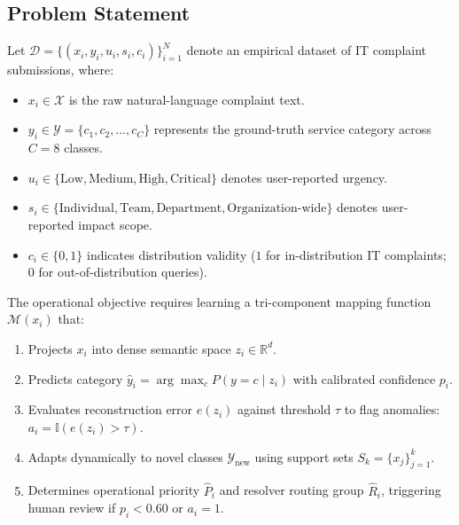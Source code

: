 \documentclass[conference]{IEEEtran}
\begin{document}
\subsection{Problem Statement}
Let $\mathcal{D} = \{(x_i, y_i, u_i, s_i, c_i)\}_{i=1}^N$ denote an empirical dataset of IT complaint submissions, where:
\begin{itemize}
    \item $x_i \in \mathcal{X}$ is the raw natural-language complaint text.
    \item $y_i \in \mathcal{Y} = \{c_1, c_2, \dots, c_C\}$ represents the ground-truth service category across $C = 8$ classes.
    \item $u_i \in \{\text{Low}, \text{Medium}, \text{High}, \text{Critical}\}$ denotes user-reported urgency.
    \item $s_i \in \{\text{Individual}, \text{Team}, \text{Department}, \text{Organization-wide}\}$ denotes user-reported impact scope.
    \item $c_i \in \{0, 1\}$ indicates distribution validity ($1$ for in-distribution IT complaints; $0$ for out-of-distribution queries).
\end{itemize}

The operational objective requires learning a tri-component mapping function $\mathcal{M}(x_i)$ that:
\begin{enumerate}
    \item Projects $x_i$ into dense semantic space $z_i \in \mathbb{R}^d$.
    \item Predicts category $\hat{y}_i = \arg\max_c P(y=c \mid z_i)$ with calibrated confidence $p_i$.
    \item Evaluates reconstruction error $e(z_i)$ against threshold $\tau$ to flag anomalies: $a_i = \mathbb{I}(e(z_i) > \tau)$.
    \item Adapts dynamically to novel classes $\mathcal{Y}_{\text{new}}$ using support sets $S_k = \{x_j\}_{j=1}^k$.
    \item Determines operational priority $\hat{P}_i$ and resolver routing group $\hat{R}_i$, triggering human review if $p_i < 0.60$ or $a_i = 1$.
\end{enumerate}
\end{document}
